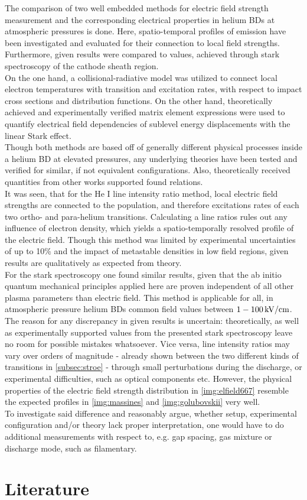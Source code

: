 \documentclass[a4paper,10pt,twoside]{article}
\begin{document}
		The comparison of two well embedded methods for electric field strength measurement and the corresponding electrical properties in helium BDs at atmospheric pressures is done. Here, spatio-temporal profiles of emission have been investigated and evaluated for their connection to local field strengths. Furthermore, given results were compared to values, achieved through stark spectroscopy of the cathode sheath region.\\
		On the one hand, a collisional-radiative model was utilized to connect local electron temperatures with transition and excitation rates, with respect to impact cross sections and distribution functions. On the other hand, theoretically achieved and experimentally verified matrix element expressions were used to quantify electrical field dependencies of sublevel energy displacements with the linear Stark effect.\\
		Though both methods are based off of generally different physical processes inside a helium BD at elevated pressures, any underlying theories have been tested and verified for similar, if not equivalent configurations. Also, theoretically received quantities from other works supported found relations.\\
		It was seen, that for the He I line intensity ratio method, local electric field strengths are connected to the population, and therefore excitations rates of each two ortho- and para-helium transitions. Calculating a line ratios rules out any influence of electron density, which yields a spatio-temporally resolved profile of the electric field. Though this method was limited by experimental uncertainties of up to 10\% and the impact of metastable densities in low field regions, given results are qualitatively as expected from theory.\\
		For the stark spectroscopy one found similar results, given that the ab initio quantum mechanical principles applied here are proven independent of all other plasma parameters than electric field. This method is applicable for all, in atmospheric pressure helium BDs common field values between $\unit[1-100]{kV/cm}$.\\
		The reason for any discrepancy in given results is uncertain: theoretically, as well as experimentally supported values from the presented stark spectroscopy leave no room for possible mistakes whatsoever. Vice versa, line intensity ratios may vary over orders of magnitude - already shown between the two different kinds of transitions in \autoref{subsec:stroe} - through small perturbations during the discharge, or experimental difficulties, such as optical components etc. However, the physical properties of the electric field strength distribution in \autoref{img:elfield667} resemble the expected profiles in \autoref{img:massines} and \autoref{img:golubovskii} very well.\\
		To investigate said difference and reasonably argue, whether setup, experimental configuration and/or theory lack proper interpretation, one would have to do additional measurements with respect to, e.g. gap spacing, gas mixture or discharge mode, such as filamentary.
		
	\section{Literature}

		
		
\end{document}
